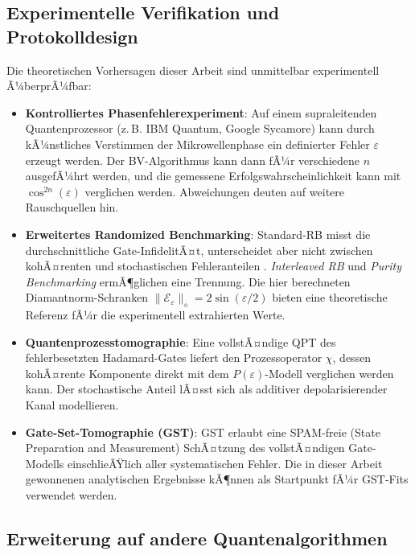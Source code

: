 ﻿\documentclass[11pt,a4paper]{article}
\theoremstyle{definition}
\newcommand{\eps}{\varepsilon}
\newcommand{\Fdiam}{\|\mathcal{E}_\eps\|_\diamond}
\begin{document}
\subsection{Experimentelle Verifikation und Protokolldesign}
\label{subsec:experiment}

Die theoretischen Vorhersagen dieser Arbeit sind unmittelbar experimentell
Ã¼berprÃ¼fbar:

\begin{itemize}
  \item \textbf{Kontrolliertes Phasenfehlerexperiment}: Auf einem
        supraleitenden Quantenprozessor (z.\,B. IBM Quantum, Google Sycamore)
        kann durch kÃ¼nstliches Verstimmen der Mikrowellenphase ein definierter
        Fehler $\eps$ erzeugt werden.  Der BV-Algorithmus kann dann fÃ¼r
        verschiedene $n$ ausgefÃ¼hrt werden, und die gemessene
        Erfolgswahrscheinlichkeit kann mit $\cos^{2n}(\eps)$ verglichen werden.
        Abweichungen deuten auf weitere Rauschquellen hin.

  \item \textbf{Erweitertes Randomized Benchmarking}: Standard-RB misst
        die durchschnittliche Gate-InfidelitÃ¤t, unterscheidet aber nicht
        zwischen kohÃ¤renten und stochastischen Fehleranteilen \cite{Magesan2011}.
        \emph{Interleaved RB} \cite{Magesan2012} und \emph{Purity Benchmarking}
        \cite{Emerson2005} ermÃ¶glichen eine Trennung.  Die hier berechneten
        Diamantnorm-Schranken $\Fdiam = 2\sin(\eps/2)$ bieten eine
        theoretische Referenz fÃ¼r die experimentell extrahierten Werte.

  \item \textbf{Quantenprozesstomographie}: Eine vollstÃ¤ndige QPT des
        fehlerbesetzten Hadamard-Gates liefert den Prozessoperator $\chi$,
        dessen kohÃ¤rente Komponente direkt mit dem $P(\eps)$-Modell verglichen
        werden kann.  Der stochastische Anteil lÃ¤sst sich als additiver
        depolarisierender Kanal modellieren.

  \item \textbf{Gate-Set-Tomographie (GST)}: GST \cite{Blume-Kohout2017}
        erlaubt eine SPAM-freie (State Preparation and Measurement) SchÃ¤tzung
        des vollstÃ¤ndigen Gate-Modells einschlieÃŸlich aller systematischen
        Fehler.  Die in dieser Arbeit gewonnenen analytischen Ergebnisse kÃ¶nnen
        als Startpunkt fÃ¼r GST-Fits verwendet werden.
\end{itemize}

\subsection{Erweiterung auf andere Quantenalgorithmen}
\label{subsec:algorithms}
\end{document}
